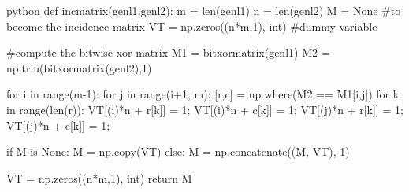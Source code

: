 \documentclass[11pt, parskip=half]{scrbook}
\begin{document}
\begin{codeblock}{python}
    def incmatrix(genl1,genl2):
    m = len(genl1)
    n = len(genl2)
    M = None #to become the incidence matrix
    VT = np.zeros((n*m,1), int)  #dummy variable
    
    #compute the bitwise xor matrix
    M1 = bitxormatrix(genl1)
    M2 = np.triu(bitxormatrix(genl2),1) 

    for i in range(m-1):
        for j in range(i+1, m):
            [r,c] = np.where(M2 == M1[i,j])
            for k in range(len(r)):
                VT[(i)*n + r[k]] = 1;
                VT[(i)*n + c[k]] = 1;
                VT[(j)*n + r[k]] = 1;
                VT[(j)*n + c[k]] = 1;
                
                if M is None:
                    M = np.copy(VT)
                else:
                    M = np.concatenate((M, VT), 1)
                
                VT = np.zeros((n*m,1), int)
    return M

\end{codeblock}
\end{document}

